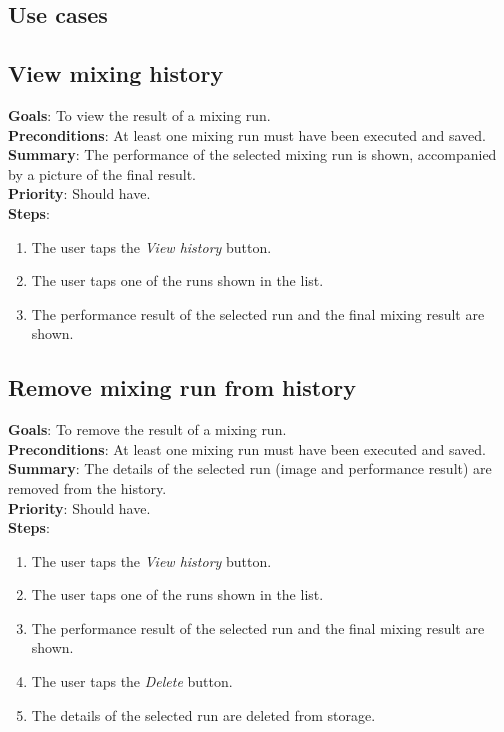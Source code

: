 \begin{appendices}
\chapter{Use cases}
\section{View mixing history}
  \textbf{Goals}: To view the result of a mixing run.\\
  \textbf{Preconditions}: At least one mixing run must have been executed and saved.\\
  \textbf{Summary}: The performance of the selected mixing run is shown, accompanied by a picture of the final result.\\
  \textbf{Priority}: Should have.\\
  \textbf{Steps}:
  \begin{enumerate}
    \item The user taps the \emph{View history} button.
    \item The user taps one of the runs shown in the list.
    \item The performance result of the selected run and the final mixing result are shown.
  \end{enumerate}
  
\section{Remove mixing run from history}
  \textbf{Goals}: To remove the result of a mixing run.\\
  \textbf{Preconditions}: At least one mixing run must have been executed and saved.\\
  \textbf{Summary}: The details of the selected run (image and performance result) are removed from the history.\\
  \textbf{Priority}: Should have.\\
  \textbf{Steps}:
  \begin{enumerate}
    \item The user taps the \emph{View history} button.
    \item The user taps one of the runs shown in the list.
    \item The performance result of the selected run and the final mixing result are shown.
    \item The user taps the \emph{Delete} button.
    \item The details of the selected run are deleted from storage.
  \end{enumerate}
\end{appendices}
